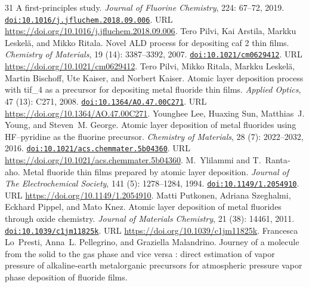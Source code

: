 \documentclass[11pt,a4paper]{article}
\theoremstyle{plain}
\theoremstyle{definition}
\theoremstyle{remark}
\providecommand{\doi}[1]{\href{https://doi.org/#1}{\texttt{doi:#1}}}
\begin{document}
\begin{thebibliography}{31}
  A first-principles study.
\newblock \emph{Journal of Fluorine Chemistry}, 224: 67--72, 2019.
\newblock \doi{10.1016/j.jfluchem.2018.09.006}.
\newblock URL \url{https://doi.org/10.1016/j.jfluchem.2018.09.006}.
Tero Pilvi, Kai Arstila, Markku Leskelä, and Mikko Ritala.
\newblock Novel {ALD} process for depositing caf 2 thin films.
\newblock \emph{Chemistry of Materials}, 19 (14): 3387--3392,
  2007.
\newblock \doi{10.1021/cm0629412}.
\newblock URL \url{https://doi.org/10.1021/cm0629412}.
Tero Pilvi, Mikko Ritala, Markku Leskelä, Martin Bischoff, Ute Kaiser, and
  Norbert Kaiser.
\newblock Atomic layer deposition process with tif\_4 as a precursor for
  depositing metal fluoride thin films.
\newblock \emph{Applied Optics}, 47 (13): C271, 2008.
\newblock \doi{10.1364/AO.47.00C271}.
\newblock URL \url{https://doi.org/10.1364/AO.47.00C271}.
Younghee Lee, Huaxing Sun, Matthias~J. Young, and Steven~M. George.
\newblock Atomic layer deposition of metal fluorides using {HF}–pyridine as
  the fluorine precursor.
\newblock \emph{Chemistry of Materials}, 28 (7): 2022--2032,
  2016.
\newblock \doi{10.1021/acs.chemmater.5b04360}.
\newblock URL \url{https://doi.org/10.1021/acs.chemmater.5b04360}.
M.~Ylilammi and T.~Ranta‐aho.
\newblock Metal fluoride thin films prepared by atomic layer deposition.
\newblock \emph{Journal of The Electrochemical Society}, 141
  (5): 1278--1284, 1994.
\newblock \doi{10.1149/1.2054910}.
\newblock URL \url{https://doi.org/10.1149/1.2054910}.
Matti Putkonen, Adriana Szeghalmi, Eckhard Pippel, and Mato Knez.
\newblock Atomic layer deposition of metal fluorides through oxide chemistry.
\newblock \emph{Journal of Materials Chemistry}, 21 (38):
  14461, 2011.
\newblock \doi{10.1039/c1jm11825k}.
\newblock URL \url{https://doi.org/10.1039/c1jm11825k}.
Francesca Lo~Presti, Anna~L. Pellegrino, and Graziella Malandrino.
\newblock Journey of a molecule from the solid to the gas phase and vice versa
  : direct estimation of vapor pressure of alkaline-earth metalorganic
  precursors for atmospheric pressure vapor phase deposition of fluoride films.

\end{thebibliography}
\end{document}

